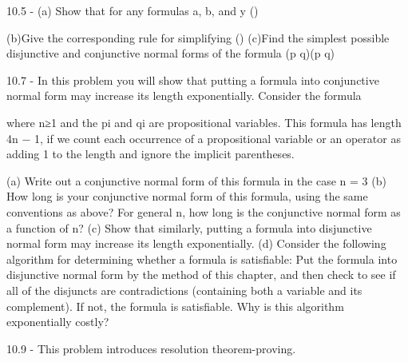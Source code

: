 \documentclass[12pt]{article}
\begin{document}
 10.5 - (a) Show that for any formulas a, b, and y 
 (\alpha \wedge \beta)\vee \alpha \vee \gamma \equiv \alpha \vee \gamma

 (b)Give the corresponding rule for simplifying
 (\alpha \vee \beta)\wedge \alpha \wedge \gamma 
 (c)Find the simplest possible disjunctive and conjunctive normal forms of the formula
 (p \wedge q)\Rightarrow(p \oplus q)



 10.7 - In this problem you will show that putting a formula into conjunctive normal form may increase its length exponentially. Consider the formula

 where n≥1 and the pi and qi are propositional variables. This formula has length 4n − 1, if we count each occurrence of a propositional variable or  an operator as adding 1 to the length and ignore the implicit parentheses.

 (a) Write out a conjunctive normal form of this formula in the case n = 3
 (b) How long is your conjunctive normal form of this formula, using the same conventions as above? For general n, how long is the conjunctive normal form as a function of n?
 (c) Show that similarly, putting a formula into disjunctive normal form may                                                                           
 increase its length exponentially.
 (d) Consider the following algorithm for determining whether a formula                                                                                
 is satisfiable: Put the formula into disjunctive normal form by the method of this chapter, and then check to see if all of the disjuncts are contradictions (containing both a variable and its complement). If not, the formula is satisfiable. Why is this algorithm exponentially costly?

 10.9 - This problem introduces resolution theorem-proving.

 
\end{document}
